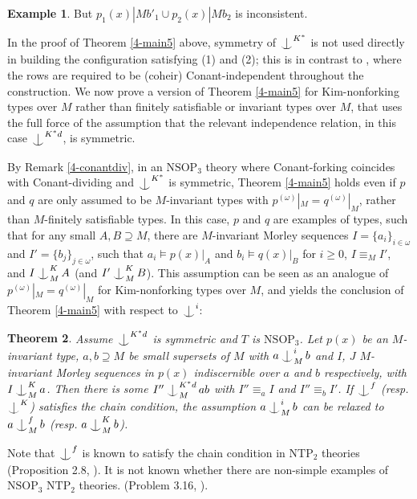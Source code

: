 \documentclass[12pt]{amsart}
\newtheorem{theorem}{Theorem}[section]
\theoremstyle{definition}
\newtheorem{example}[theorem]{Example}
\def\Ind#1#2{#1\setbox0=\hbox{$#1x$}\kern\wd0\hbox to 0pt{\hss$#1\mid$\hss}
\lower.9\ht0\hbox to 0pt{\hss$#1\smile$\hss}\kern\wd0}
\def\ind{\mathop{\mathpalette\Ind{}}}
\begin{document}
\begin{example}
But $p_{1}(x)|Mb'_{1} \cup p_{2}(x)|Mb_{2}$ is inconsistent.
\end{example}


In the proof of Theorem \ref{4-main5} above, symmetry of $\ind^{K^{*}}$ is not used directly in building the configuration satisfying (1) and (2); this is in contrast to \cite{NSOP2}, where the rows are required to be (coheir) Conant-independent throughout the construction. We now prove a version of Theorem \ref{4-main5} for Kim-nonforking types over $M$ rather than finitely satisfiable or invariant types over $M$, that uses the full force of the assumption that the relevant independence relation, in this case $\ind^{K^{*}d}$, is symmetric.

By Remark \ref{4-conantdiv}, in an $\mathrm{NSOP}_{3}$ theory where Conant-forking coincides with Conant-dividing and $\ind^{K^{*}}$ is symmetric, Theorem \ref{4-main5} holds even if $p$ and $q$ are only assumed to be $M$-invariant types with $p^{(\omega)}|_{M} = q^{(\omega)}|_{M}$, rather than $M$-finitely satisfiable types. In this case, $p$ and $q$ are examples of types, such that for any small $A,B \supseteq M$, there are $M$-invariant Morley sequences $I=\{a_{i}\}_{i \in \omega}$ and $I' = \{b_{j}\}_{j \in \omega}$, such that $a_{i} \models p(x)|_{A}$ and $b_{i} \models q(x)|_{B}$ for $i \geq 0$, $I \equiv_{M} I'$, and $I \ind^{K}_{M} A$ (and $I' \ind^{K}_{M} B$). This assumption can be seen as an analogue of $p^{(\omega)}|_{M} = q^{(\omega)}|_{M}$ for Kim-nonforking types over $M$, and yields the conclusion of Theorem \ref{4-main5} with respect to $\ind^{i}$:

\begin{theorem}\label{4-main5b}
    Assume $\ind^{K^{*}d}$ is symmetric and $T$ is $\mathrm{NSOP}_{3}$. Let $p(x)$ be an $M$-invariant type, $a, b \supseteq M$ be small supersets of $M$ with $a \ind_{M}^{i} b$ and $I$, $J$ $M$-invariant Morley sequences in $p(x)$ indiscernible over $a$ and $b$ respectively, with $I \ind_{M}^{K} a$. Then there is some $I'' \ind_{M}^{K^{*}d} ab$ with $I'' \equiv_{a} I$ and $I'' \equiv_{b} I'$. If $\ind^{f}$ (resp. $\ind^{K}$) satisfies the chain condition, the assumption $a \ind_{M}^{i} b$ can be relaxed to $a \ind_{M}^{f} b$ (resp. $a \ind_{M}^{K} b$).
\end{theorem}


Note that $\ind^{f}$ is known to satisfy the chain condition in $\mathrm{NTP}_{2}$ theories (Proposition 2.8, \cite{BYC07}). It is not known whether there are non-simple examples of $\mathrm{NSOP}_{3}$ $\mathrm{NTP}_{2}$ theories. (Problem 3.16, \cite{Che14}).
\end{document}
